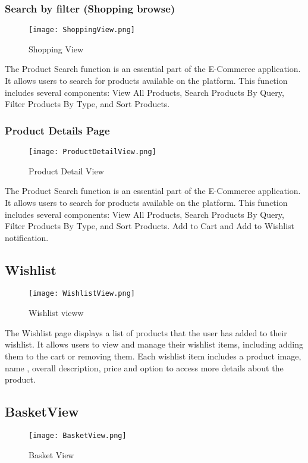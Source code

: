 \subsubsection{Search by filter (Shopping browse)}
\begin{figure}[H]
    \texttt{[image: ShoppingView.png]}
    \caption{Shopping View}
    \label{fig:ShoppingView}
\end{figure}
The Product Search function is an essential part of the E-Commerce application. It allows users to search for products available on the platform. This function includes several components: View All Products, Search Products By Query, Filter Products By Type, and Sort Products.

\subsubsection{Product Details Page}
\begin{figure}[H]
    \texttt{[image: ProductDetailView.png]}
    \caption{Product Detail View}
    \label{fig:ProductDetailView}
\end{figure}
The Product Search function is an essential part of the E-Commerce application. It allows users to search for products available on the platform. This function includes several components: View All Products, Search Products By Query, Filter Products By Type, and Sort Products.
Add to Cart and Add to Wishlist notification.

\subsection{Wishlist}
\begin{figure}[H]
    \texttt{[image: WishlistView.png]}
    \caption{Wishlist vieww}
    \label{fig:WishlistView}
\end{figure}
The Wishlist page displays a list of products that the user has added to their wishlist. It allows users to view and manage their wishlist items, including adding them to the cart or removing them. Each wishlist item includes a product image, name , overall description, price and option to access more details about the product.


\subsection{BasketView}
\begin{figure}[H]
    \texttt{[image: BasketView.png]}
    \caption{Basket View}
    \label{fig:BasketView}
\end{figure}

